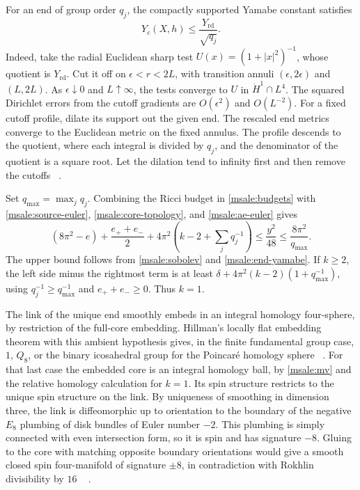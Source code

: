 \documentclass[11pt]{article}
\numberwithin{equation}{section}
\theoremstyle{definition}
\theoremstyle{remark}
\newcommand{\rd}{\mathrm{rd}}
\begin{document}
For an end of group order \(q_j\), the compactly supported Yamabe
constant satisfies
\begin{equation}\label{msale:end-yamabe}
 Y_c(X,h)\le \frac{Y_{\rd}}{\sqrt{q_j}} .
\end{equation}
Indeed, take the radial Euclidean sharp test
\(U(x)=(1+|x|^2)^{-1}\), whose quotient is \(Y_{\rd}\).
Cut it off on \(\epsilon<r<2L\), with transition annuli
\((\epsilon,2\epsilon)\) and \((L,2L)\). As
\(\epsilon\downarrow0\) and \(L\uparrow\infty\), the tests converge
to \(U\) in \(\dot H^1\cap L^4\). The squared Dirichlet errors
from the cutoff gradients are \(O(\epsilon^2)\) and \(O(L^{-2})\).
For a fixed cutoff profile, dilate its support out the given end.
The rescaled end metrics converge to the Euclidean metric on
the fixed annulus. The profile descends to the quotient, where
each integral is divided by \(q_j\), and the denominator of the
quotient is a square root. Let the dilation tend to infinity
first and then remove the cutoffs
~\cite{Talenti1976BestConstant}\cite[Theorem 3.3]{LeeParker1987Yamabe}.

Set \(q_{\max}=\max_j q_j\). Combining the Ricci budget in
\eqref{msale:budgets} with \eqref{msale:source-euler},
\eqref{msale:core-topology}, and \eqref{msale:ae-euler} gives
\begin{equation}\label{msale:end-count}
 (8\pi^2-e)+\frac{e_++e_-}{2}
 +4\pi^2\left(k-2+\sum_jq_j^{-1}\right)
 \le\frac{y^2}{48}\le\frac{8\pi^2}{q_{\max}} .
\end{equation}
The upper bound follows from \eqref{msale:sobolev} and
\eqref{msale:end-yamabe}. If \(k\ge2\), the left side minus the
rightmost term is at least
\(\delta+4\pi^2(k-2)(1+q_{\max}^{-1})\), using
\(q_j^{-1}\ge q_{\max}^{-1}\) and \(e_++e_-\ge0\).
Thus \(k=1\).

The link of the unique end smoothly embeds in an integral homology
four-sphere, by restriction of the full-core embedding. Hillman's
locally flat embedding theorem with this ambient hypothesis gives,
in the finite fundamental group case, \(1\), \(Q_8\), or the
binary icosahedral group for the Poincar\'e homology sphere
~\cite[Theorem 5.2(1) and Corollary 4.4.2]{Hillman2024LocallyFlat}.
For that last case the embedded core is an integral homology ball,
by \eqref{msale:mv} and the relative homology calculation for
\(k=1\). Its spin structure restricts to the unique spin structure
on the link. By uniqueness of smoothing in dimension three, the
link is diffeomorphic up to orientation to the boundary of the
negative \(E_8\) plumbing of disk bundles of Euler number
\(-2\). This plumbing is simply connected with even intersection
form, so it is spin and has signature \(-8\). Gluing to the core
with matching opposite boundary orientations would give a smooth
closed spin four-manifold of signature \(\pm8\), in contradiction
with Rokhlin divisibility by \(16\)
~\cite[Descriptions (1) and (4)]{KirbyScharlemann1979Poincare}%
\cite[\S1.2]{Rokhlin1971Submanifolds}.
\end{document}
